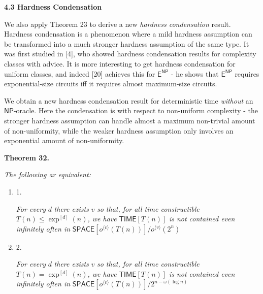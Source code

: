 \documentclass[10pt,a4paper]{article}
\begin{document}
\par\medskip\noindent\textbf{
4.3 Hardness Condensation}\par




We also apply Theorem 23 to derive a new \emph{hardness condensation} result. Hardness condensation is a phenomenon where a mild hardness assumption can be transformed into a much stronger hardness assumption of the same type. It was first studied in [4], who showed hardness condensation results for complexity classes with advice. It is more interesting to get hardness condensation for uniform classes, and indeed [20] achieves this for ${\mathsf{E}}^{{\mathsf{NP}}}$ - he shows that ${\mathsf{E}}^{{\mathsf{NP}}}$ requires exponential-size circuits iff it requires almost maximum-size circuits.\par




We obtain a new hardness condensation result for deterministic time \emph{without} an ${\mathsf{NP}}$-oracle. Here the condensation is with respect to non-uniform complexity - the stronger hardness assumption can handle almost a maximum non-trivial amount of non-uniformity, while the weaker hardness assumption only involves an exponential amount of non-uniformity.\par





\par\medskip\noindent\textbf{
\textbf{Theorem 32}\textbf{.}
}\par



\emph{The following ar equivalent:}\par


\begin{enumerate}


\item[] 
1. 


\emph{For every }$d$\emph{ there exists }$v$\emph{ so that, for all time constructible }$T(n)\leq\exp^{[d]}(n)$\emph{, we have }${\mathsf{TIME}}[T(n)]$\emph{ is not contained even infinitely often in }${\mathsf{SPACE}}[o^{\langle v\rangle}(T(n))]/o^{\langle v\rangle}(2^{n})$\emph{}\par





\item[] 
2. 


\emph{For every }$d$\emph{ there exists }$v$\emph{ so that, for all time constructible }$T(n)=\exp^{[d]}(n)$\emph{, we have }${\mathsf{TIME}}[T(n)]$\emph{ is not contained even infinitely often in }${\mathsf{SPACE}}[o^{\langle v\rangle}(T(n))]/2^{n-\omega(\log n)}$\emph{}\par





\end{enumerate}
\end{document}
